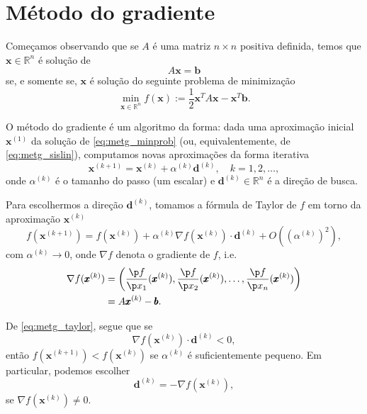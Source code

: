 \section{Método do gradiente}\label{cap_sl_iter_sec_metg}

Começamos observando que se $A$ é uma matriz $n\times n$ positiva definida, temos que $\pmb{x}\in\mathbb{R}^n$ é solução de
\begin{equation}\label{eq:metg_sislin}
  A\pmb{x} = \pmb{b}
\end{equation}
se, e somente se, $\pmb{x}$ é solução do seguinte problema de minimização
\begin{equation}\label{eq:metg_minprob}
  \min_{\pmb{x}\in\mathbb{R}^n}f(\pmb{x}) := \frac{1}{2}\pmb{x}^TA\pmb{x}-\pmb{x}^T\pmb{b}.
\end{equation}

O método do gradiente é um algoritmo da forma: dada uma aproximação inicial $\pmb{x}^{(1)}$ da solução de \eqref{eq:metg_minprob} (ou, equivalentemente, de \eqref{eq:metg_sislin}), computamos novas aproximações da forma iterativa
\begin{equation}
  \pmb{x}^{(k+1)} = \pmb{x}^{(k)} + \alpha^{(k)}\pmb{d}^{(k)},\quad k=1, 2, \ldots,
\end{equation}
onde $\alpha^{(k)}$ é o tamanho do passo (um escalar) e $\pmb{d}^{(k)}\in\mathbb{R}^n$ é a direção de busca.

Para escolhermos a direção $\pmb{d}^{(k)}$, tomamos a fórmula de Taylor de $f$ em torno da aproximação $\pmb{x}^{(k)}$
\begin{equation}\label{eq:metg_taylor}
  f(\pmb{x}^{(k+1)}) = f(\pmb{x}^{(k)}) + \alpha^{(k)}\nabla f(\pmb{x}^{(k)})\cdot \pmb{d}^{(k)} + O\left((\alpha^{(k)})^2\right),
\end{equation}
com $\alpha^{(k)}\to 0$, onde $\nabla f$ denota o gradiente de $f$, i.e.
\begin{align}
  \nabla f(\pmb{x}^{(k)}) &= \left(\frac{\p f}{\p x_1}(\pmb{x}^{(k)}), \frac{\p f}{\p x_2}(\pmb{x}^{(k)}), \dotsc, \frac{\p f}{\p x_n}(\pmb{x}^{(k)})\right)\\
  &= A\pmb{x}^{(k)}-\pmb{b}.
\end{align}


De \eqref{eq:metg_taylor}, segue que se
\begin{equation}
  \nabla f(\pmb{x}^{(k)})\cdot \pmb{d}^{(k)} < 0,
\end{equation}
então $f(\pmb{x}^{(k+1)}) < f(\pmb{x}^{(k)})$ se $\alpha^{(k)}$ é suficientemente pequeno. Em particular, podemos escolher
\begin{equation}
  \pmb{d}^{(k)} = -\nabla f(\pmb{x}^{(k)}),
\end{equation}
se $\nabla f(\pmb{x}^{(k)})\neq 0$.

